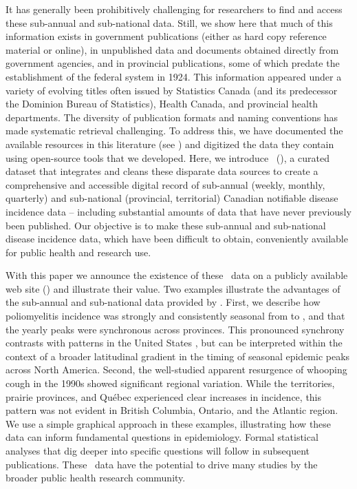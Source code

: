 \documentclass[12pt]{article}
\begin{document}
It has generally been prohibitively challenging for researchers to find and access these sub-annual and sub-national data. Still, we show here that much of this information exists in government publications (either as hard copy reference material or online), in unpublished data and documents obtained directly from government agencies, and in provincial publications, some of which predate the establishment of the federal system in 1924. This information appeared under a variety of evolving titles often issued by Statistics Canada (and its predecessor the Dominion Bureau of Statistics), Health Canada, and provincial health departments. The diversity of publication formats and naming conventions has made systematic retrieval challenging. To address this, we have documented the available resources in this literature (see ) and digitized the data they contain using open-source tools that we developed. Here, we introduce \datacronym\ (\datname), a curated dataset that integrates and cleans these disparate data sources to create a comprehensive and accessible digital record of sub-annual (weekly, monthly, quarterly) and sub-national (provincial, territorial) Canadian notifiable disease incidence data -- including substantial amounts of data that have never previously been published. Our objective is to make these sub-annual and sub-national disease incidence data, which have been difficult to obtain, conveniently available for public health and research use.

With this paper we announce the existence of these \datacronym\ data on a publicly available web site () and illustrate their value. Two examples illustrate the advantages of the sub-annual and sub-national data provided by \datacronym. First, we describe how poliomyelitis incidence was strongly and consistently seasonal from  to , and that the yearly peaks were synchronous across provinces. This pronounced synchrony contrasts with patterns in the United States \cite{martinez2015unraveling}, but can be interpreted within the context of a broader latitudinal gradient in the timing of seasonal epidemic peaks across North America. Second, the well-studied apparent resurgence of whooping cough in the 1990s showed significant regional variation. While the territories, prairie provinces, and Qu\'ebec experienced clear increases in incidence, this pattern was not evident in British Columbia, Ontario, and the Atlantic region. We use a simple graphical approach in these examples, illustrating how these data can inform fundamental questions in epidemiology. Formal statistical analyses that dig deeper into specific questions will follow in subsequent publications. These \datacronym\ data have the potential to drive many studies by the broader public health research community.
\end{document}
